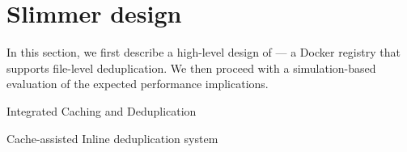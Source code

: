 \section{Slimmer design}
\label{sec:slimmer}

%
In this section, we first describe a high-level design of \emph{\sysname}---
a Docker registry that supports file-level deduplication.
We then proceed with a simulation-based evaluation of the expected performance
implications.

Integrated Caching and Deduplication

Cache-assisted Inline deduplication system








